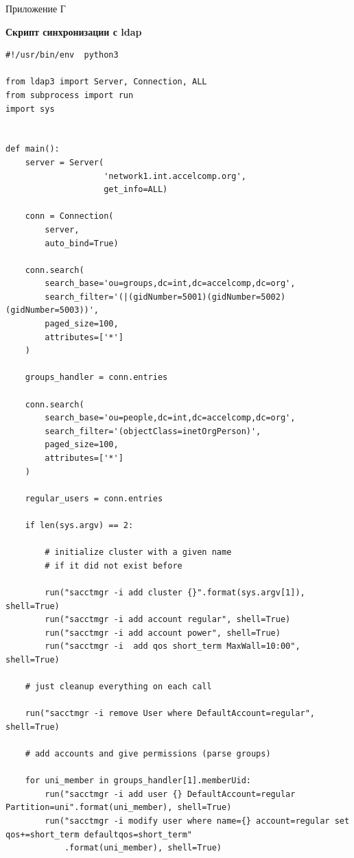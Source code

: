 \documentclass[a4paper]{extarticle}
\begin{document}
\newpage

\begin{flushright}Приложение Г\end{flushright}
\centerline{\textbf{Скрипт синхронизации с ldap}}

\begin{verbatim}
#!/usr/bin/env  python3

from ldap3 import Server, Connection, ALL
from subprocess import run
import sys


def main():
    server = Server(
                    'network1.int.accelcomp.org',
                    get_info=ALL)

    conn = Connection(
        server,
        auto_bind=True)

    conn.search(
        search_base='ou=groups,dc=int,dc=accelcomp,dc=org',
        search_filter='(|(gidNumber=5001)(gidNumber=5002)(gidNumber=5003))',
        paged_size=100,
        attributes=['*']
    )

    groups_handler = conn.entries

    conn.search(
        search_base='ou=people,dc=int,dc=accelcomp,dc=org',
        search_filter='(objectClass=inetOrgPerson)',
        paged_size=100,
        attributes=['*']
    )

    regular_users = conn.entries

    if len(sys.argv) == 2:

        # initialize cluster with a given name
        # if it did not exist before

        run("sacctmgr -i add cluster {}".format(sys.argv[1]), shell=True)
        run("sacctmgr -i add account regular", shell=True)
        run("sacctmgr -i add account power", shell=True)
        run("sacctmgr -i  add qos short_term MaxWall=10:00", shell=True)

    # just cleanup everything on each call

    run("sacctmgr -i remove User where DefaultAccount=regular", shell=True)

    # add accounts and give permissions (parse groups)

    for uni_member in groups_handler[1].memberUid:
        run("sacctmgr -i add user {} DefaultAccount=regular Partition=uni".format(uni_member), shell=True)
        run("sacctmgr -i modify user where name={} account=regular set qos+=short_term defaultqos=short_term"
            .format(uni_member), shell=True)


\end{verbatim}
\end{document}

